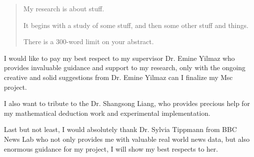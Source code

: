 \maketitle
\makedeclaration

\begin{abstract} %
My research is about stuff.

It begins with a study of some stuff, and then some other stuff and things.

There is a 300-word limit on your abstract.
\end{abstract}

\begin{acknowledgements}

I would like to pay my best respect to my supervisor Dr. Emine Yilmaz who provides invaluable guidance and support to my research, only with the ongoing creative and solid suggestions from Dr. Emine Yilmaz can I finalize my Msc project. 

I also want to tribute to the Dr. Shangsong Liang, who provides precious help for my mathematical deduction work and experimental implementation.

Last but not least, I would absolutely thank Dr. Sylvia Tippmann from BBC News Lab who not only provides me with valuable real world news data, but also enormous guidance for my project, I will show my best respects to her.
\end{acknowledgements}

\setcounter{tocdepth}{2} 

\tableofcontents
\listoffigures
\listoftables

